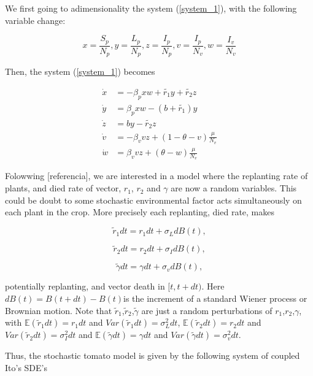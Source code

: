We first going to adimensionality the system (\ref{system_1}), with the following variable change:

\begin{equation*}
	x=\frac{S_p}{N_p}, y=\frac{L_p}{N_p}, z=\frac{I_p}{N_p}, v=\frac{I_p}{N_v}, w=\frac{I_v}{N_v}
\end{equation*}

Then, the system (\ref{system_1}) becomes

\begin{align}\label{system_2}
\dot{x} &=
-\beta_p x w + \tilde{r_1} y + \tilde{r_2} z \\
\dot{y} &=
\beta_p x w - (b + \tilde{r_1}) y \\
\dot{z} &=
b y - \tilde{r_2} z \\
\dot{v} &=
-\beta_v v z  +(1-\theta-v)\frac{\mu}{N_v} \\
\dot{w} &=
\beta_v v z + (\theta-w) \frac{\mu}{N_v}
\end{align}


Folowwing [referencia], we are interested in a model where the replanting rate of plants, and died rate of vector, $r_1$, $r_2$ and $\gamma$ are now a random variables. This could be doubt to some stochastic environmental factor acts simultaneously on each plant in the crop. More precisely each replanting, died rate, makes

\begin{equation}\label{eq1}
	\tilde{r}_1 dt = r_1 dt+\sigma_LdB(t),
\end{equation}

\begin{equation}\label{eq2}
\tilde{r}_2 dt = r_2 dt+\sigma_IdB(t),
\end{equation}

\begin{equation}\label{eq3}
\tilde{\gamma} dt = \gamma dt+\sigma_vdB(t),
\end{equation}

potentially replanting, and vector death  in $[t, t + dt)$. Here $dB(t) =B(t+dt)-B(t)$is the increment of a standard Wiener process or Brownian motion. Note that $\tilde{r}_1$,$\tilde{r}_2$,$\tilde{\gamma}$ are just a random perturbations of $r_1$,$r_2$,$\gamma$, with $\mathbb{E}(\tilde{r}_1dt) = r_1dt$ and $Var(\tilde{r}_1dt) = \sigma_L^2dt$, $\mathbb{E}(\tilde{r}_2dt) = r_2dt$ and $Var(\tilde{r}_2dt) = \sigma_I^2dt$ and $\mathbb{E}(\tilde{\gamma}dt) = \gamma dt$ and $Var(\tilde{\gamma}dt) = \sigma_v^2dt$.

Thus, the stochastic tomato model is given by the following system of coupled Ito's SDE's

